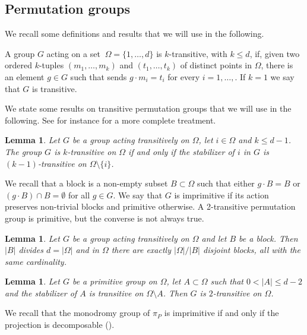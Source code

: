 \documentclass[12pt,a4paper,twoside,leqno,noamsfonts]{amsart}
\newtheorem{lem}[cor]{Lemma}
\theoremstyle{definition}
\begin{document}
\subsection{Permutation groups} \label{permutazioni}
We recall some definitions and results that we will use in the following. 

A group $G$ acting on a set $\ \Omega=\{1,\ldots,d\}$ is $k$-transitive, with $k \leq d$, if, given two ordered $k$-tuples $(m_1,\ldots,m_k)$ and $(t_1,\ldots,t_k)$ of distinct points in $\Omega$, there is an element $g \in G$ such that sends $g \cdot m_i=t_i$ for every $i=1,\ldots,$. If $k=1$ we say that $G$ is transitive. 

We state some results on transitive permutation groups that we will use in the following. See for instance \cite[Chapter 8]{Isaacs} for a more complete treatment.

\begin{lem}\label{lemma1}
Let $G$ be a group acting transitively on $\Omega$, let $i \in \Omega$ and $k \leq d-1$. 
The group $G$ is $k$-transitive on $\Omega$ if and only if the stabilizer of $i$ in $G$ is $(k-1)$-transitive on $\Omega \setminus \{i\}$. 
\end{lem}

We recall that a {block} is a non-empty subset $B \subset \Omega$ such that either $g\cdot B=B$ or $(g\cdot B) \cap B = \emptyset$ for all $g \in G$. We say that $G$ is {imprimitive} if its action preserves non-trivial blocks and {primitive} otherwise. A 2-transitive permutation group is primitive, but the converse is not always true. 
\begin{lem}\label{block}
Let $G$ be a group acting transitively on $\Omega$ and let $B$ be a block. Then $|B|$ divides $d=|\Omega|$ and in $\Omega$ there are exactly ${|\Omega|}/{|B|}$ disjoint blocks, all with the same cardinality.
\end{lem}

\begin{lem}\label{lemma2}
Let $G$ be a primitive group on $\Omega$, let $A \subset \Omega$ such that $0 < |A| \leq d-2$ and the stabilizer of $A$ is transitive on $\Omega \setminus A$.  
Then $G$ is $2$-transitive on $\Omega$. 
\end{lem}
We recall that the monodromy group of $\pi_P$ is imprimitive if and only if the projection is decomposable (\cite[Remark 2.2]{PS}). 
\end{document}
